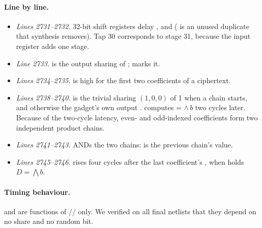 \paragraph{Line by line.}
\begin{itemize}
  \item \emph{Lines 2731--2732.} 32-bit shift registers delay ,  and  ( is an unused duplicate that synthesis removes). Tap 30 corresponds to stage 31, because the input register adds one stage.
  \item \emph{Line 2733.}  is the output sharing of ;  marks it.
  \item \emph{Lines 2734--2735.}  is high for the first two coefficients of a ciphertext.
  \item \emph{Lines 2738--2740.}  is the trivial sharing $(1, 0, 0)$ of 1 when a chain starts, and otherwise the gadget's own output .  computes  =  $\wedge\, b$ two cycles later. Because of the two-cycle latency, even- and odd-indexed coefficients form two independent product chains.
  \item \emph{Lines 2741--2743.}  ANDs the two chains:  is the previous chain's value.
  \item \emph{Lines 2745--2746.}  rises four cycles after the last coefficient's , when  holds $D = \bigwedge b$.
\end{itemize}

\paragraph{Timing behaviour.}  and  are functions of // only. We verified on all final netlists that they depend on no share and no random bit.

